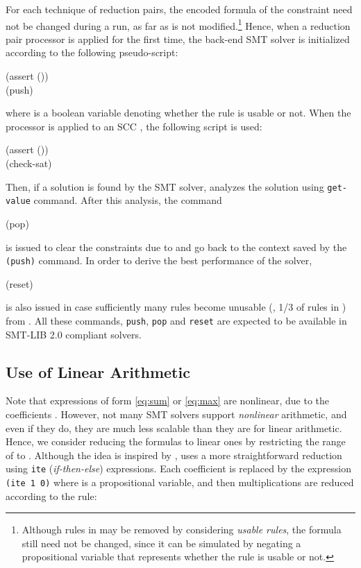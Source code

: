 \documentclass{llncs}
\begin{document}
For each technique of reduction pairs,
the encoded formula of the constraint
 need not be changed
during a run, as far as  is not modified.\footnote{Although rules in  may be removed by considering \emph{usable rules},
	the formula still need not be changed, since
	it can be simulated by negating a propositional variable that
	represents whether the rule is usable or not.
}
Hence, when a reduction pair processor is applied for the first time,
the back-end SMT solver is initialized according to the following pseudo-script:
\begin{Script}
	(assert ())\\
	(push)
\end{Script}where  is a boolean variable denoting
whether the rule  is usable or not.
When the processor is applied to an SCC ,
the following script is used:
\begin{Script}
	(assert ())\\
	(check-sat)
\end{Script}
Then, if a solution is found by the SMT solver,
\NaTT analyzes the solution using \texttt{get-value} command.
After this analysis, the command
\begin{Script}
 	(pop)
\end{Script}
is issued to clear the constraints due to  and go back to
the context saved by the \texttt{(push)} command.
In order to derive the best performance of the solver,
\begin{Script}
	(reset)
\end{Script}
is also issued in case sufficiently many rules
become unusable (\eg, 1/3 of rules in ) from .
All these commands, \texttt{push}, \texttt{pop} and \texttt{reset}
are expected to be available in SMT-LIB 2.0 compliant solvers.

\subsection{Use of Linear Arithmetic}
\label{sec:linearization}

Note that expressions of form \eqref{eq:sum} or \eqref{eq:max} are nonlinear,
due to the coefficients .
However, not many SMT solvers support \emph{nonlinear} arithmetic,
and even if they do, they are much less scalable than they are for linear arithmetic.
Hence, we consider reducing the formulas to linear ones
by restricting the range of  \eg to .
Although the idea is inspired by \cite{BLNRR09},
\NaTT uses a more straightforward reduction using
\texttt{ite} (\emph{if-then-else}) expressions.
Each coefficient  is replaced by
the expression \texttt{(ite  1 0)}
where  is a propositional variable,
and then multiplications are reduced according to the rule:
\end{document}
